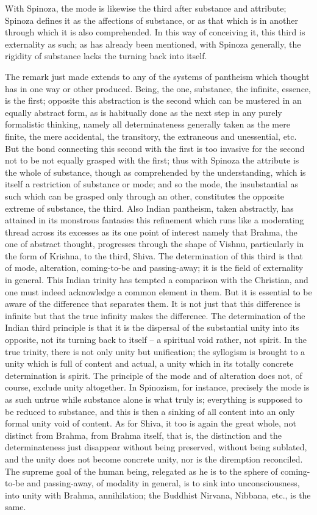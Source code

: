 With Spinoza, the mode is likewise the third after substance and attribute;
Spinoza defines it as the affections of substance, or as that which
is in another through which it is also comprehended.
In this way of conceiving it, this third is externality as such;
as has already been mentioned, with Spinoza generally,
the rigidity of substance lacks the turning back into itself.

The remark just made extends to any of the systems of pantheism which
thought has in one way or other produced.
Being, the one, substance, the infinite, essence, is the first;
opposite this abstraction is the second which
can be mustered in an equally abstract form, as is habitually done as the
next step in any purely formalistic thinking,
namely all determinateness generally taken as the mere finite,
the mere accidental, the transitory, the extraneous and unessential, etc.
But the bond connecting this second with the first is too invasive
for the second not to be not equally grasped with the first;
thus with Spinoza the attribute is the whole of substance,
though as comprehended by the understanding,
which is itself a restriction of substance or mode;
and so the mode, the insubstantial as such which can
be grasped only through an other,
constitutes the opposite extreme of substance, the third.
Also Indian pantheism, taken abstractly, has attained
in its monstrous fantasies this refinement which runs like a moderating
thread across its excesses as its one point of interest
namely that Brahma, the one of abstract thought,
progresses through the shape of Vishnu,
particularly in the form of Krishna, to the third, Shiva.
The determination of this third is that of mode, alteration,
coming-to-be and passing-away;
it is the field of externality in general.
This Indian trinity has tempted a comparison with the Christian, and
one must indeed acknowledge a common element in them.
But it is essential to be aware of the difference that separates them.
It is not just that this difference is infinite but that the
true infinity makes the difference.
The determination of the Indian third principle is that
it is the dispersal of the substantial unity into its opposite,
not its turning back to itself – a spiritual void rather, not spirit.
In the true trinity, there is not only unity but unification;
the syllogism is brought to a unity which is full of content and actual,
a unity which in its totally concrete determination is spirit.
The principle of the mode and of alteration
does not, of course, exclude unity altogether.
In Spinozism, for instance, precisely the mode is as such untrue
while substance alone is what truly is;
everything is supposed to be reduced to substance, and
this is then a sinking of all content into an only formal unity void of content.
As for Shiva, it too is again the great whole,
not distinct from Brahma, from Brahma itself, that is,
the distinction and the determinateness just disappear
without being preserved, without being sublated, and
the unity does not become concrete unity, nor is the diremption reconciled.
The supreme goal of the human being, relegated as he is to
the sphere of coming-to-be and passing-away, of modality in general,
is to sink into unconsciousness, into unity with Brahma, annihilation;
the Buddhist Nirvana, Nibbana, etc., is the same.

